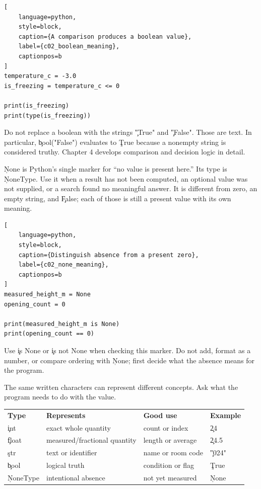 \begin{lstlisting}[
    language=python,
    style=block,
    caption={A comparison produces a boolean value},
    label={c02_boolean_meaning},
    captionpos=b
]
temperature_c = -3.0
is_freezing = temperature_c <= 0

print(is_freezing)
print(type(is_freezing))
\end{lstlisting}

Do not replace a boolean with the strings \c{"True"} and \c{"False"}. Those
are text. In particular, \c{bool("False")} evaluates to \c{True} because a
nonempty string is considered truthy. Chapter 4 develops comparison and
decision logic in detail.


\c{None} is Python's single marker for ``no value is present here.'' Its type
is \c{NoneType}. Use it when a result has not been computed, an optional value
was not supplied, or a search found no meaningful answer. It is different from
zero, an empty string, and \c{False}; each of those is still a present value
with its own meaning.

\begin{lstlisting}[
    language=python,
    style=block,
    caption={Distinguish absence from a present zero},
    label={c02_none_meaning},
    captionpos=b
]
measured_height_m = None
opening_count = 0

print(measured_height_m is None)
print(opening_count == 0)
\end{lstlisting}

Use \c{is None} or \c{is not None} when checking this marker. Do not add,
format as a number, or compare ordering with \c{None}; first decide what the
absence means for the program.


The same written characters can represent different concepts. Ask what the
program needs to do with the value.

\begin{center}
\small
\begin{tabular}{llll}
\textbf{Type} & \textbf{Represents} & \textbf{Good use} & \textbf{Example} \\
\c{int} & exact whole quantity & count or index & \c{24} \\
\c{float} & measured/fractional quantity & length or average & \c{24.5} \\
\c{str} & text or identifier & name or room code & \c{"024"} \\
\c{bool} & logical truth & condition or flag & \c{True} \\
\c{NoneType} & intentional absence & not yet measured & \c{None} \\
\end{tabular}
\end{center}

